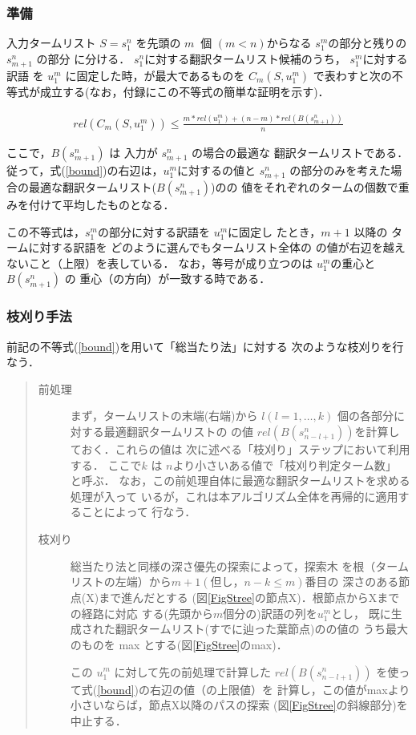 \subsubsection{準備}  

  入力タームリスト $S = s_1^n $ を先頭の
 $ m \: $ 個 $(m<n)$からなる $ s_1^m$の部分と残りの$s_{m+1}^n$ の部分
に分ける． 
$ s_1^n $に対する翻訳タームリスト候補のうち， $ s_1^m $に対する訳語
を $ u_1^m $ に固定した時，\kd が最大であるものを $ C_m(S, u_1^m) $ 
で表わすと次の不等式が成立する(なお，付録にこの不等式の簡単な証明を示す)．

\begin{eqnarray}
rel(C_m(S, u_1^m))  \leq  
   \frac{m * rel(u_1^m) + (n - m) * rel(B(s_{m+1}^n))}{n} \label{bound}
\end{eqnarray}

ここで，$B(s_{m+1}^n)$ は 入力が  $s_{m+1}^n$ の場合の最適な
翻訳タームリストである．
従って，式(\ref{bound})の右辺は，$ u_1^m $に対する\kd の値と $s_{m+1}^n$
の部分のみを考えた場合の最適な翻訳タームリスト($B(s_{m+1}^n)$)の\kd の
値をそれぞれのタームの個数で重みを付けて平均したものとなる． 

  この不等式は，$ s_1^m $の部分に対する訳語を $ u_1^m $に固定し
たとき，$ m+1$ 以降の
タームに対する訳語を どのように選んでもタームリスト全体の 
\kd の値が右辺を越えないこと（上限）を表している．
なお，等号が成り立つのは $ u_1^m $の重心と$ B(s_{m+1}^n)$ の
重心（の方向）が一致する時である．

\subsubsection{枝刈り手法}  

  前記の不等式(\ref{bound})を用いて「総当たり法」に対する
次のような枝刈りを行なう．

\begin{quote}
\begin{description}
\item [前処理] まず，タームリストの末端(右端)から 
$ l (l = 1, \ldots, k)$ 個の各部分に対する最適翻訳タームリストの
\ikd の値 $rel(B(s_{n-l+1}^n))$を計算しておく．これらの値は
次に述べる「枝刈り」ステップにおいて利用する． 
ここで$k $ は $n $より小さいある値で「枝刈り判定ターム数」
と呼ぶ．
なお，この前処理自体に最適な翻訳タームリストを求める処理が入って
いるが，これは本アルゴリズム全体を再帰的に適用することによって
行なう．

\item [枝刈り] 総当たり法と同様の深さ優先の探索によって，探索木
を根（タームリストの左端）から$m + 1 (但し， n - k \leq m)$番目の
深さのある節点(X)まで進んだとする
(図\ref{FigStree}の節点X)．根節点からXまでの経路に対応
する(先頭から$m$個分の)訳語の列を$ u_1^m $とし，
既に生成された翻訳タームリスト(すでに辿った葉節点)の\ikd の値の
うち最大のものを max とする(図\ref{FigStree}のmax)．

この $ u_1^m $ に対して先の前処理で計算した  $rel(B(s_{n-l+1}^n))$
を使って式(\ref{bound})の右辺の値（\ikd の上限値）を
計算し，この値がmaxより小さいならば，節点X以降のパスの探索
(図\ref{FigStree}の斜線部分)を中止する．
\end{description}
\end{quote}

